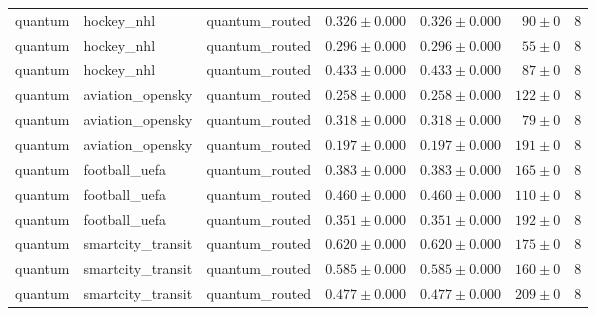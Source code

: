 \begin{table}[htbp]
\begin{tabular}{l l l r r r r}
quantum & hockey\_nhl & quantum\_routed & $0.326\pm0.000$ & $0.326\pm0.000$ & $90\pm0$ & 8 \\
quantum & hockey\_nhl & quantum\_routed & $0.296\pm0.000$ & $0.296\pm0.000$ & $55\pm0$ & 8 \\
quantum & hockey\_nhl & quantum\_routed & $0.433\pm0.000$ & $0.433\pm0.000$ & $87\pm0$ & 8 \\
quantum & aviation\_opensky & quantum\_routed & $0.258\pm0.000$ & $0.258\pm0.000$ & $122\pm0$ & 8 \\
quantum & aviation\_opensky & quantum\_routed & $0.318\pm0.000$ & $0.318\pm0.000$ & $79\pm0$ & 8 \\
quantum & aviation\_opensky & quantum\_routed & $0.197\pm0.000$ & $0.197\pm0.000$ & $191\pm0$ & 8 \\
quantum & football\_uefa & quantum\_routed & $0.383\pm0.000$ & $0.383\pm0.000$ & $165\pm0$ & 8 \\
quantum & football\_uefa & quantum\_routed & $0.460\pm0.000$ & $0.460\pm0.000$ & $110\pm0$ & 8 \\
quantum & football\_uefa & quantum\_routed & $0.351\pm0.000$ & $0.351\pm0.000$ & $192\pm0$ & 8 \\
quantum & smartcity\_transit & quantum\_routed & $0.620\pm0.000$ & $0.620\pm0.000$ & $175\pm0$ & 8 \\
quantum & smartcity\_transit & quantum\_routed & $0.585\pm0.000$ & $0.585\pm0.000$ & $160\pm0$ & 8 \\
quantum & smartcity\_transit & quantum\_routed & $0.477\pm0.000$ & $0.477\pm0.000$ & $209\pm0$ & 8 \\
\hline
\end{tabular}
\end{table}
